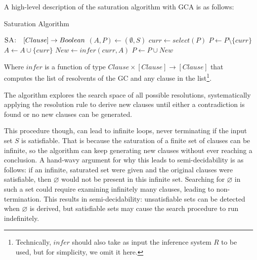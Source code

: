 A high-level description of the saturation algorithm with GCA is as follows:
\begin{algorithm}[H]
    \caption{Saturation Algorithm}\label{alg:saturation-algorithm}
    \begin{algorithmic}[1]
        \Statex{}  \(\textsc{SA:} \quad [Clause] \to Boolean\)
            \State{} \((A,P)\gets (\emptyset,S)\)
                \State{} \(curr \gets select(P)\)
                \State{} \(P \gets P \setminus \{curr\}\)
                \State{} \(A \gets A \cup \{curr\}\)
                \State{} \(New \gets infer(curr, A)\)
                    \State{}  
                \EndIf{}
                \State{} \(P \gets P \cup New\)
            \EndWhile{}
            \State{} 
        \EndFunction{}
    \end{algorithmic}
\end{algorithm}

Where \(infer\) is a function of type \(Clause \times [Clause] \to [Clause]\) that computes the list of resolvents of the GC and any clause in the list\footnote{
  Technically, \(infer\) should also take as input the inference system \(R\) to be used, but for simplicity, we omit it here.
}.

The algorithm explores the search space of all possible resolutions, systematically applying the resolution rule to derive new clauses until either a contradiction is found or no new clauses can be generated.

This procedure though, can lead to infinite loops, never terminating if the input set \(S\) is satisfiable.
That is because the saturation of a finite set of clauses can be infinite, so the algorithm can keep generating new clauses without ever reaching a conclusion.
A hand-wavy argument for why this leads to semi-decidability is as follows: if an infinite, saturated set were given and the original clauses were satisfiable, then \(\varnothing\) would not be present in this infinite set.
Searching for \(\varnothing\) in such a set could require examining infinitely many clauses, leading to non-termination.
This results in semi-decidability: unsatisfiable sets can be detected when \(\varnothing\) is derived, but satisfiable sets may cause the search procedure to run indefinitely.

